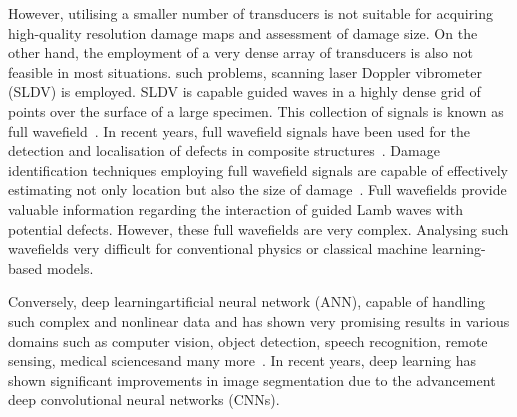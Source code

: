 However, utilising a smaller number of transducers is not suitable for acquiring high-quality resolution damage maps and assessment of damage size.
On the other hand, the employment of a very dense array of transducers is also not feasible in most situations. 
\DIFdelbegin {}\DIFdelend \DIFaddbegin {}\DIFaddend such problems, \DIFaddbegin {}\DIFaddend scanning laser Doppler vibrometer (SLDV) is employed.
SLDV is capable \DIFdelbegin {}\DIFdelend \DIFaddbegin {}\DIFaddend guided waves in a highly dense grid of points over the surface of a large specimen.
This collection of signals is known as full wavefield~\cite{Radzienski2019a}. 
In recent years, full wavefield signals have been used for the detection and localisation of defects in composite
structures~\cite{Radzienski2019a, Girolamo2018a, kudela2018impact,  rogge2013characterization}.
Damage identification techniques employing full wavefield signals are capable of effectively estimating not only \DIFaddbegin {}\DIFaddend location but also the size of damage~\cite{Girolamo2018a, kudela2018impact}.
Full wavefields provide valuable information regarding the interaction of guided Lamb waves with potential defects.
However, these full wavefields are very complex.
Analysing such wavefields \DIFdelbegin {}\DIFdelend \DIFaddbegin {}\DIFaddend very difficult for conventional physics or classical machine learning-based models.

Conversely, deep learning\DIFdelbegin {}\DIFdelend \DIFaddbegin {}\DIFaddend artificial neural network (ANN), \DIFdelbegin {}\DIFdelend \DIFaddbegin {}\DIFaddend capable of handling such complex and nonlinear data and has shown very promising results in various domains such as computer vision, object detection, speech recognition, remote sensing, medical sciences\DIFaddbegin \DIFadd{, }\DIFaddend and many more~\cite{mohanty2016using, zhang2020well, pashaei2020review}.
In recent years, deep learning has shown significant improvements in image segmentation due to the advancement \DIFdelbegin {}\DIFdelend \DIFaddbegin {}\DIFaddend deep convolutional neural networks (CNNs).

